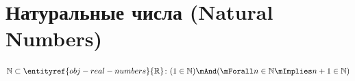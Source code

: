 
\section{Натуральные числа (Natural Numbers)}

\hypertarget{obj-natural-numbers}{}
\hypertarget{obj-natural-numbers}{}
\begin{object}
\label{entity:obj-natural-numbers}

\[
\mathbb{N} \subset \entityref{obj-real-numbers}{\mathbb{R}} \colon (1 \in \mathbb{N}) \mAnd (\mForall n \in \mathbb{N} \mImplies n + 1 \in \mathbb{N})
\]
\end{object}